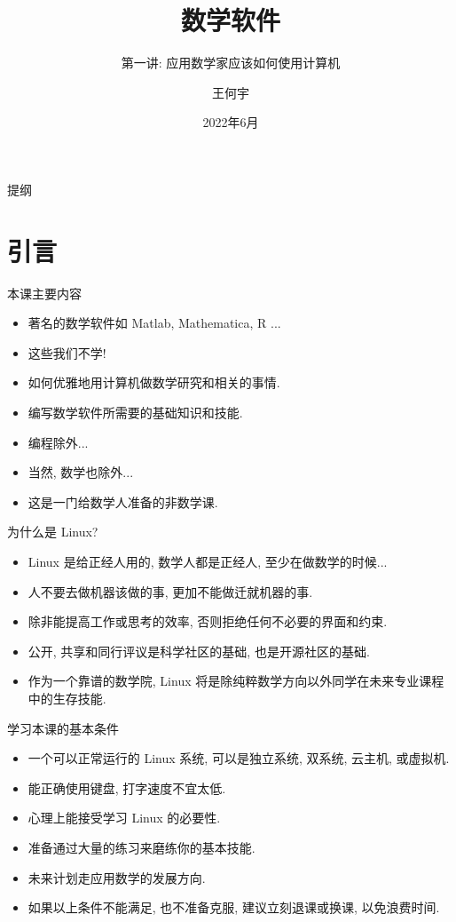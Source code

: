 \documentclass{beamer}
\title[Beamer + xelatex] %
{\Huge 数学软件}
\subtitle
{第一讲: 应用数学家应该如何使用计算机} %
\author[Wang HY] %
{王何宇}
\institute[ZJU] %
{
  浙江大学数学科学学院\\
  信息与计算科学系
}
\date[] %
{2022年6月}
\begin{document}
\begin{frame}
 \titlepage
\end{frame}
\begin{frame}{提纲}
  \tableofcontents
\end{frame}

\section{引言}

\begin{frame}{本课主要内容}
  \begin{itemize}
  \item<1-> 著名的数学软件如 Matlab, Mathematica, R ...
  \item<2-> 这些我们不学!
  \item<3-> 如何优雅地用计算机做数学研究和相关的事情.
  \item<4-> 编写数学软件所需要的基础知识和技能.
  \item<5-> 编程除外...
  \item<6-> 当然, 数学也除外...
  \item<7-> 这是一门给数学人准备的非数学课.
  \end{itemize}
\end{frame}

\begin{frame}{为什么是 Linux?}
  \begin{itemize}
  \item<1-> Linux 是给正经人用的, 数学人都是正经人, 至少在做数学的时候... 
  \item<2-> 人不要去做机器该做的事, 更加不能做迁就机器的事.
  \item<3-> 除非能提高工作或思考的效率, 否则拒绝任何不必要的界面和约束. 
  \item<4-> 公开, 共享和同行评议是科学社区的基础, 也是开源社区的基础.
  \item<5-> 作为一个靠谱的数学院, Linux 将是除纯粹数学方向以外同学在未来专业课程中的生存技能.
  \end{itemize}
\end{frame}

\begin{frame}{学习本课的基本条件}
  \begin{itemize}
  \item<1-> 一个可以正常运行的 Linux 系统, 可以是独立系统, 双系统, 云主机, 或虚拟机.
  \item<2-> 能正确使用键盘, 打字速度不宜太低.
  \item<3-> 心理上能接受学习 Linux 的必要性. 
  \item<4-> 准备通过大量的练习来磨练你的基本技能.  
  \item<5-> 未来计划走应用数学的发展方向.
  \item<6-> 如果以上条件不能满足, 也不准备克服, 建议立刻退课或换课, 以免浪费时间.
  \end{itemize}
\end{frame}
\end{document}
